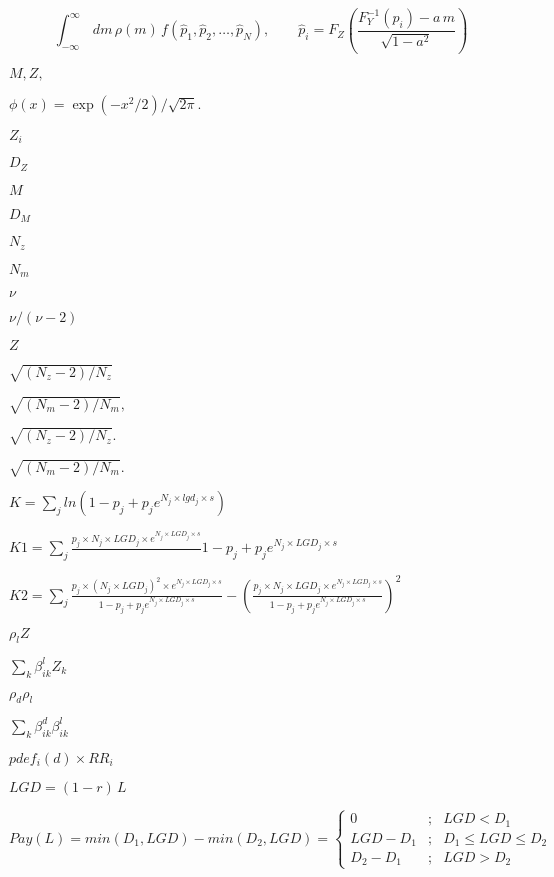\documentclass{article}
\begin{document}
\[\int_{-\infty}^\infty\,dm\,\rho(m)\, f (\hat p_1, \hat p_2, \dots,
\hat p_N), \qquad
\hat p_i = F_Z \left( \frac{F_Y^{-1}(p_i)-a\,m}{\sqrt{1-a^2}}\right)
\]
\pagebreak

$ M, Z,$
\pagebreak

$ \phi(x) = \exp(-x^2/2) / \sqrt{2\pi}. $
\pagebreak

$ Z_i $
\pagebreak

$ D_Z $
\pagebreak

$ M $
\pagebreak

$ D_M $
\pagebreak

$ N_z $
\pagebreak

$ N_m $
\pagebreak

$ \nu $
\pagebreak

$ \nu / (\nu - 2) $
\pagebreak

$ Z $
\pagebreak

$ \sqrt{(N_z - 2) / N_z} $
\pagebreak

$ \sqrt{(N_m - 2) / N_m}, $
\pagebreak

$ \sqrt{(N_z - 2) /
N_z}.$
\pagebreak

$ \sqrt{(N_m - 2) /
N_m}. $
\pagebreak

$ K = \sum_j ln(1-p_j + p_j e^{N_j \times lgd_j \times s}) $
\pagebreak

$ K1 = \sum_j \frac{p_j \times N_j \times LGD_j \times 
        e^{N_j \times LGD_j \times s}} \
                     {1-p_j + p_j e^{N_j \times LGD_j \times s}} $
\pagebreak

$ K2 = \sum_j \frac{p_j \times (N_j \times LGD_j)^2 \times 
        e^{N_j \times LGD_j \times s}}
                     {1-p_j + p_j e^{N_j \times LGD_j \times s}}
              - (\frac{p_j \times N_j \times LGD_j \times e^{N_j \times 
              LGD_j \times s}}
                     {1-p_j + p_j e^{N_j \times LGD_j \times s}})^2 $
\pagebreak

$\rho_l Z $
\pagebreak

$ \sum_k \beta_{ik}^l Z_k $
\pagebreak

$ \rho_d \rho_l $
\pagebreak

$ \sum_k \beta_{ik}^d \beta_{ik}^l $
\pagebreak

$pdef_i(d) \times RR_i $
\pagebreak

$ LGD = (1-r)\,L $
\pagebreak

\[Pay(L) = min (D_1, LGD) - min (D_2, LGD) = \left\{
\begin{array}{lcl}
\displaystyle 0 &;& LGD < D_1 \\
\displaystyle LGD - D_1 &;& D_1 \leq LGD \leq D_2 \\
\displaystyle D_2 - D_1 &;& LGD > D_2
\end{array}
\right.
\]
\pagebreak
\end{document}
